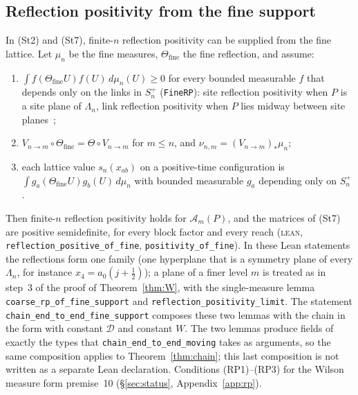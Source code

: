 \documentclass[11pt,a4paper]{article}
\theoremstyle{definition}
\theoremstyle{remark}
\newcommand{\tagL}{\textsc{lean}}
\newcommand{\lt}[1]{\texttt{#1}}
\begin{document}
\subsection{Reflection positivity from the fine support}\label{subsec:rp}
In (St2) and (St7), finite-$n$ reflection positivity can be supplied from the fine lattice. Let $\mu_n$ be the fine measures, $\Theta_{\mathrm{fine}}$ the fine reflection, and assume:
\begin{enumerate}[label=(RP\arabic*),leftmargin=3em]
\item $\int f(\Theta_{\mathrm{fine}}U)f(U)\,d\mu_n(U)\ge0$ for every bounded measurable $f$ that depends only on the links in $S_n^+$ (\lt{FineRP}): site reflection positivity when $P$ is a site plane of $\Lambda_n$, link reflection positivity when $P$ lies midway between site planes~\cite{OSe};
\item $V_{n\to m}\circ\Theta_{\mathrm{fine}}=\Theta\circ V_{n\to m}$ for $m\le n$, and $\nu_{n,m}=(V_{n\to m})_*\mu_n$;
\item each lattice value $s_n(x_{ab})$ on a positive-time configuration is $\int g_a(\Theta_{\mathrm{fine}}U)g_b(U)\,d\mu_n$ with bounded measurable $g_a$ depending only on $S_n^+$.
\end{enumerate}
Then finite-$n$ reflection positivity holds for $\mathcal A_m(P)$, and the matrices of (St7) are positive semidefinite, for every block factor and every reach (\tagL, \lt{reflection\_\allowbreak{}positive\_\allowbreak{}of\_\allowbreak{}fine}, \lt{positivity\_\allowbreak{}of\_\allowbreak{}fine}). In these Lean statements the reflections form one family (one hyperplane that is a symmetry plane of every $\Lambda_n$, for instance $x_4=a_0(j+\tfrac12)$); a plane of a finer level $m$ is treated as in step~3 of the proof of Theorem~\ref{thm:W}, with the single-measure lemma \lt{coarse\_\allowbreak{}rp\_\allowbreak{}of\_\allowbreak{}fine\_\allowbreak{}support} and \lt{reflection\_\allowbreak{}positivity\_\allowbreak{}limit}. The statement \lt{chain\_\allowbreak{}end\_\allowbreak{}to\_\allowbreak{}end\_\allowbreak{}fine\_\allowbreak{}support} composes these two lemmas with the chain in the form with constant $\mathcal D$ and constant $W$. The two lemmas produce fields of exactly the types that \lt{chain\_\allowbreak{}end\_\allowbreak{}to\_\allowbreak{}end\_\allowbreak{}moving} takes as arguments, so the same composition applies to Theorem~\ref{thm:chain}; this last composition is not written as a separate Lean declaration. Conditions (RP1)--(RP3) for the Wilson measure form premise~10 (\S\ref{sec:status}, Appendix~\ref{app:rp}).
\end{document}
